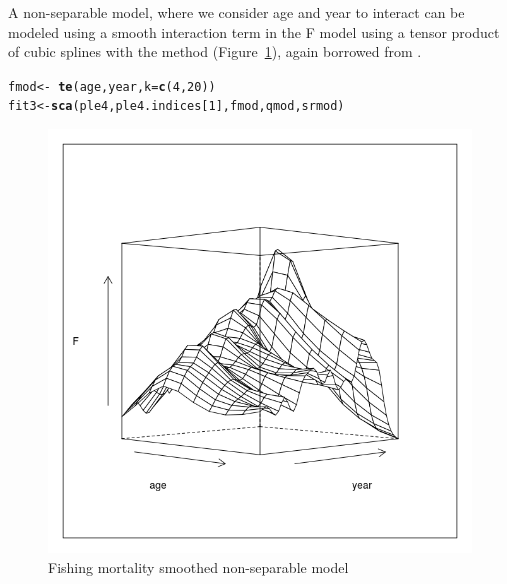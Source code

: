 \documentclass[a4paper,english,10pt]{article}\usepackage[]{graphicx}\usepackage[]{color}
\makeatletter
\def\maxwidth{ %
  \ifdim\Gin@nat@width>\linewidth
    \linewidth
  \else
    \Gin@nat@width
  \fi
}
\newcommand{\hlnum}[1]{\textcolor[rgb]{0.686,0.059,0.569}{#1}}%
\newcommand{\hlopt}[1]{\textcolor[rgb]{0,0,0}{#1}}%
\newcommand{\hlstd}[1]{\textcolor[rgb]{0.345,0.345,0.345}{#1}}%
\newcommand{\hlkwb}[1]{\textcolor[rgb]{0.69,0.353,0.396}{#1}}%
\newcommand{\hlkwc}[1]{\textcolor[rgb]{0.333,0.667,0.333}{#1}}%
\newcommand{\hlkwd}[1]{\textcolor[rgb]{0.737,0.353,0.396}{\textbf{#1}}}%
\newenvironment{kframe}{%
 \def\at@end@of@kframe{}%
 \ifinner\ifhmode%
  \def\at@end@of@kframe{\end{minipage}}%
  \begin{minipage}{\columnwidth}%
 \fi\fi%
 \def\FrameCommand##1{\hskip\@totalleftmargin \hskip-\fboxsep
 \colorbox{shadecolor}{##1}\hskip-\fboxsep
     \hskip-\linewidth \hskip-\@totalleftmargin \hskip\columnwidth}%
 \MakeFramed {\advance\hsize-\width
   \@totalleftmargin\z@ \linewidth\hsize
   \@setminipage}}%
 {\par\unskip\endMakeFramed%
 \at@end@of@kframe}
\newenvironment{knitrout}{}{} %
\makeatother
\begin{document}
A non-separable model, where we consider age and year to interact can be modeled using a smooth interaction term in the F model using a tensor product of cubic splines with the  method (Figure~\ref{fig:te1}), again borrowed from \href{http://cran.r-project.org/web/packages/mgcv/index.html}{}. 

\begin{knitrout}
\color{fgcolor}\begin{kframe}
\begin{alltt}
\hlstd{fmod} \hlkwb{<-} \hlopt{~}\hlkwd{te}\hlstd{(age, year,} \hlkwc{k} \hlstd{=} \hlkwd{c}\hlstd{(}\hlnum{4}\hlstd{,} \hlnum{20}\hlstd{))}
\hlstd{fit3} \hlkwb{<-} \hlkwd{sca}\hlstd{(ple4, ple4.indices[}\hlnum{1}\hlstd{], fmod, qmod, srmod)}
\end{alltt}
\end{kframe}
\end{knitrout}

\begin{knitrout}
\color{fgcolor}\begin{figure}[H]

{\centering \includegraphics[width=\maxwidth]{figure/te1-1} 

}

\caption[Fishing mortality smoothed non-separable model]{Fishing mortality smoothed non-separable model}\label{fig:te1}
\end{figure}


\end{knitrout}
\end{document}
